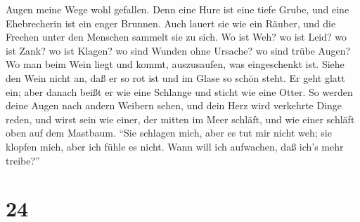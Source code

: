 Augen meine Wege wohl gefallen.  Denn eine Hure ist eine
tiefe Grube, und eine Ehebrecherin ist ein enger Brunnen. 
Auch lauert sie wie ein Räuber, und die Frechen unter den Menschen
sammelt sie zu sich.  Wo ist Weh? wo ist Leid? wo ist Zank?
wo ist Klagen? wo sind Wunden ohne Ursache? wo sind trübe Augen?
 Wo man beim Wein liegt und kommt, auszusaufen, was
eingeschenkt ist.  Siehe den Wein nicht an, daß er so rot
ist und im Glase so schön steht. Er geht glatt ein;  aber
danach beißt er wie eine Schlange und sticht wie eine Otter.
 So werden deine Augen nach andern Weibern sehen, und dein
Herz wird verkehrte Dinge reden,  und wirst sein wie einer,
der mitten im Meer schläft, und wie einer schläft oben auf dem Mastbaum.
 ``Sie schlagen mich, aber es tut mir nicht weh; sie
klopfen mich, aber ich fühle es nicht. Wann will ich aufwachen, daß
ich's mehr treibe?''

\hypertarget{section-23}{%
\section{24}\label{section-23}}

